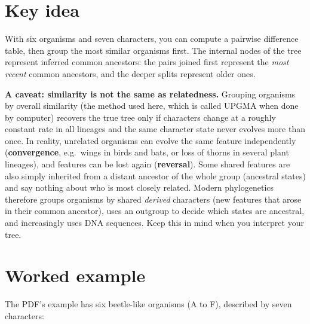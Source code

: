 \documentclass[
  a4paper]{book}
\begin{document}
\section{Key idea}\label{key-idea-4}

With six organisms and seven characters, you can compute a pairwise difference table, then group the most similar organisms first. The internal nodes of the tree represent inferred common ancestors: the pairs joined first represent the \emph{most recent} common ancestors, and the deeper splits represent older ones.

\textbf{A caveat: similarity is not the same as relatedness.} Grouping organisms by overall similarity (the method used here, which is called UPGMA when done by computer) recovers the true tree only if characters change at a roughly constant rate in all lineages and the same character state never evolves more than once. In reality, unrelated organisms can evolve the same feature independently (\textbf{convergence}, e.g.~wings in birds and bats, or loss of thorns in several plant lineages), and features can be lost again (\textbf{reversal}). Some shared features are also simply inherited from a distant ancestor of the whole group (ancestral states) and say nothing about who is most closely related. Modern phylogenetics therefore groups organisms by shared \emph{derived} characters (new features that arose in their common ancestor), uses an outgroup to decide which states are ancestral, and increasingly uses DNA sequences. Keep this in mind when you interpret your tree.

\section{Worked example}\label{worked-example-12}

The PDF's example has six beetle-like organisms (A to F), described by seven characters:
\end{document}
